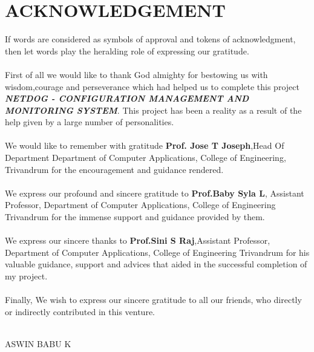 \chapter*{\rm \large \bf ACKNOWLEDGEMENT}
\vspace{4.0mm}
\setlength{\parindent}{1cm} 


\indent If words are considered as symbols of approval and tokens of
acknowledgment, then let words play the heralding role of expressing our
gratitude.\\ \\

\indent First of all we would like to thank God almighty for bestowing us with
wisdom,courage and perseverance which had helped us to complete this
project \textbf{\textit{NETDOG - CONFIGURATION MANAGEMENT AND MONITORING SYSTEM}}.
This project has been a reality as a result of the help given by a large
number of personalities.\\ \\

\indent We would like to remember with gratitude \textbf{Prof. Jose T Joseph},Head Of Department Department of Computer Applications, College of Engineering, Trivandrum for the encouragement and guidance rendered.\\ \\
\indent We express our profound and sincere gratitude to \textbf{Prof.Baby Syla L}, Assistant Professor, Department of Computer Applications, College of Engineering Trivandrum for the immense support and guidance provided by them.\\ \\
\indent We express our sincere thanks to \textbf{Prof.Sini S Raj},Assistant Professor, Department of Computer Applications, College of Engineering Trivandrum for his valuable guidance, support and advices that aided in the successful completion of my project.\\ \\
\indent Finally, We wish to express our sincere gratitude to all our friends, who directly or indirectly contributed in this venture. \\ \\




\begin{flushright}
ASWIN BABU K\\
\end{flushright}
\newpage
